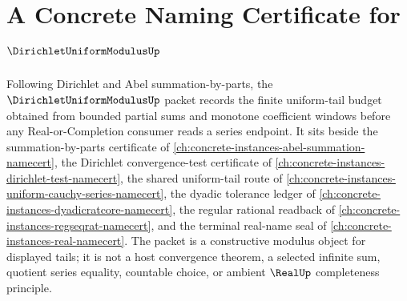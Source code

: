 \chapter{A Concrete Naming Certificate for $\DirichletUniformModulusUp$}
\label{ch:concrete-instances-dirichlet-uniform-modulus-namecert}

Following Dirichlet and Abel summation-by-parts, the $\DirichletUniformModulusUp$ packet records the finite uniform-tail budget obtained from bounded partial sums and monotone coefficient windows before any Real-or-Completion consumer reads a series endpoint. It sits beside the summation-by-parts certificate of \autoref{ch:concrete-instances-abel-summation-namecert}, the Dirichlet convergence-test certificate of \autoref{ch:concrete-instances-dirichlet-test-namecert}, the shared uniform-tail route of \autoref{ch:concrete-instances-uniform-cauchy-series-namecert}, the dyadic tolerance ledger of \autoref{ch:concrete-instances-dyadicratcore-namecert}, the regular rational readback of \autoref{ch:concrete-instances-regseqrat-namecert}, and the terminal real-name seal of \autoref{ch:concrete-instances-real-namecert}. The packet is a constructive modulus object for displayed tails; it is not a host convergence theorem, a selected infinite sum, quotient series equality, countable choice, or ambient $\RealUp$ completeness principle.

